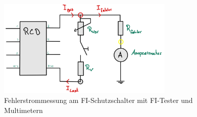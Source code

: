 \begin{enumerate}[label=\alph*)]
	\begin{figure}[h!]
		\begin{center}
			\includegraphics[width=0.75\textwidth]{img/img2.2.3.png}
		\end{center}
		\caption{Fehlerstrommessung am FI-Schutzschalter mit FI-Tester und Multimetern}\label{img2.2.3}
	\end{figure}
  \pagebreak
	

	

\end{enumerate}

